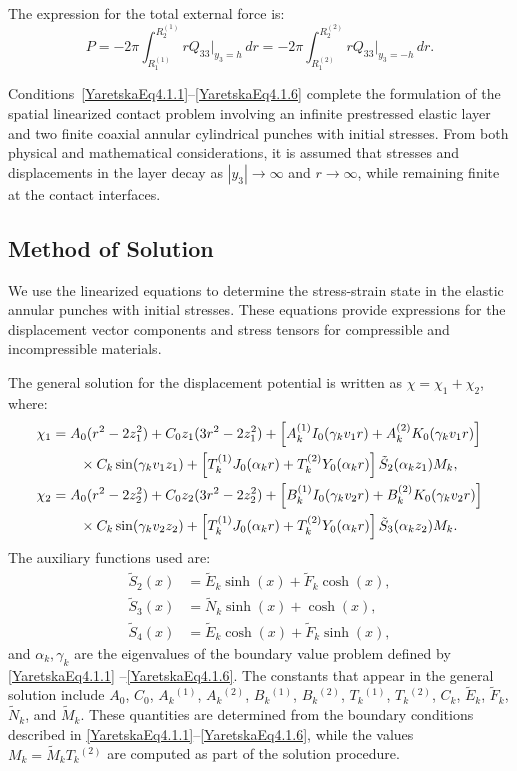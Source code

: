 The expression for the total external force is:
\begin{equation} \label{YaretskaEq4.1.6}
	P = -2\pi \int_{R_1^{(1)}}^{R_2^{(1)}} r Q_{33} \big|_{y_3 = h} \, dr
	= -2\pi \int_{R_1^{(2)}}^{R_2^{(2)}} r Q_{33} \big|_{y_3 = -h} \, dr.
\end{equation}

Conditions~\eqref{YaretskaEq4.1.1}–\eqref{YaretskaEq4.1.6} complete the formulation of the spatial linearized contact problem involving an infinite prestressed elastic layer and two finite coaxial annular cylindrical punches with initial stresses. From both physical and mathematical considerations, it is assumed that stresses and displacements in the layer decay as \( |y_3| \to \infty \) and \( r \to \infty \), while remaining finite at the contact interfaces.

\subsection{Method of Solution}

We use the linearized equations to determine the stress-strain state in the elastic annular punches with initial stresses. These equations provide expressions for the displacement vector components and stress tensors for compressible and incompressible materials.

The general solution for the displacement potential is written as \( \chi = \chi_1 + \chi_2 \), where:
\begin{align*}
	\chi_1 &= A_0 (r^2 - 2z_1^2) + C_0 z_1 (3r^2 - 2z_1^2) 
	+ \left[ A_k^{(1)} I_0(\gamma_k v_1 r) + A_k^{(2)} K_0(\gamma_k v_1 r) \right]  
	\\
	&\qquad \times C_k \sin(\gamma_k v_1 z_1)+ \left[ T_k^{(1)} J_0(\alpha_k r) + T_k^{(2)} Y_0(\alpha_k r) \right] \tilde{S}_2(\alpha_k z_1) M_k, \notag \\
	\chi_2 &= A_0 (r^2 - 2z_2^2) + C_0 z_2 (3r^2 - 2z_2^2) 
	+ \left[ B_k^{(1)} I_0(\gamma_k v_2 r) + B_k^{(2)} K_0(\gamma_k v_2 r) \right]  
	\\
	&\qquad \times C_k \sin(\gamma_k v_2 z_2)+ \left[ T_k^{(1)} J_0(\alpha_k r) + T_k^{(2)} Y_0(\alpha_k r) \right] \tilde{S}_3(\alpha_k z_2) M_k. 
\end{align*}
The auxiliary functions used are:
\[
\begin{aligned}
	\tilde{S}_2(x) &= \tilde{E}_k \sinh(x) + \tilde{F}_k \cosh(x), \\
	\tilde{S}_3(x) &= \tilde{N}_k \sinh(x) + \cosh(x), \\
	\tilde{S}_4(x) &= \tilde{E}_k \cosh(x) + \tilde{F}_k \sinh(x),
\end{aligned}
\]
and \( \alpha_k, \gamma_k \) are the eigenvalues of the boundary value problem defined by \eqref{YaretskaEq4.1.1} –\eqref{YaretskaEq4.1.6}. The constants that appear in the general solution include
$A_0$, $C_0$, $A_k{}^{(1)}$, $A_k{}^{(2)}$,
$B_k{}^{(1)}$, $B_k{}^{(2)}$, $T_k{}^{(1)}$, $T_k{}^{(2)}$,
$C_k$, $\tilde{E}_k$, $\tilde{F}_k$, $\tilde{N}_k$, and $\tilde{M}_k$.
These quantities are determined from the boundary conditions described in \eqref{YaretskaEq4.1.1}–\eqref{YaretskaEq4.1.6}, while the values $M_k = \tilde{M}_k T_k{}^{(2)}$ are computed as part of the solution procedure.


